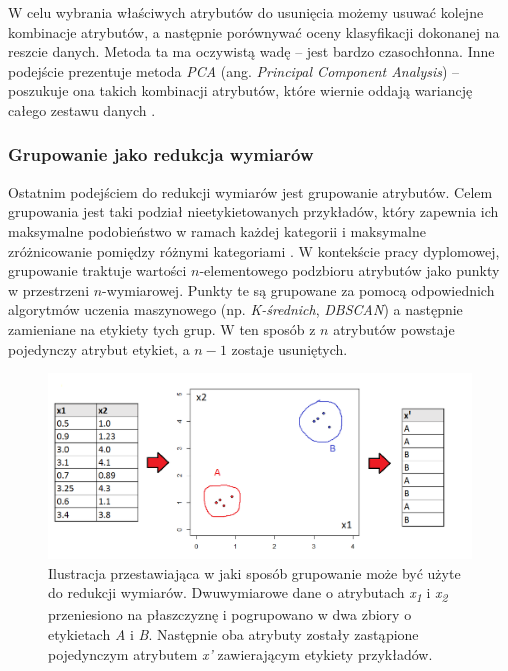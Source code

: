 \documentclass[../thesis.tex]{subfiles}
\begin{document}
W celu wybrania właściwych atrybutów do usunięcia możemy usuwać kolejne kombinacje atrybutów, a następnie porównywać oceny klasyfikacji dokonanej na reszcie danych. Metoda ta ma oczywistą wadę – jest bardzo czasochłonna. Inne podejście prezentuje metoda \emph{PCA} (ang. \emph{Principal Component Analysis}) – poszukuje ona takich kombinacji atrybutów, które wiernie oddają wariancję całego zestawu danych \cite{def_pca}. 

\subsubsection{Grupowanie jako redukcja wymiarów}

Ostatnim podejściem do redukcji wymiarów jest grupowanie atrybutów. Celem grupowania jest taki podział nieetykietowanych przykładów, który zapewnia ich maksymalne podobieństwo w ramach każdej kategorii i maksymalne zróżnicowanie pomiędzy różnymi kategoriami \cite{pcichosz}. W kontekście pracy dyplomowej, grupowanie traktuje wartości $n$-elementowego podzbioru atrybutów jako punkty w przestrzeni $n$-wymiarowej. Punkty te są grupowane za pomocą odpowiednich algorytmów uczenia maszynowego (np. \emph{K-średnich}, \emph{DBSCAN}) a następnie zamieniane na etykiety tych grup. W ten sposób z $n$ atrybutów powstaje pojedynczy atrybut etykiet, a $n-1$ zostaje usuniętych.

\begin{figure}[h]
\centering
\includegraphics[height=.25\textheight]{grouping.png}
\caption{Ilustracja przestawiająca w jaki sposób grupowanie może być użyte do redukcji wymiarów. Dwuwymiarowe dane o atrybutach \emph{x\textsubscript{1}} i \emph{x\textsubscript{2}} przeniesiono na płaszczyznę i pogrupowano w dwa zbiory o etykietach \emph{A} i \emph{B}. Następnie oba atrybuty zostały zastąpione pojedynczym atrybutem \emph{x'} zawierającym etykiety przykładów. }
\label{classification:grouping}
\end{figure}
\end{document}
